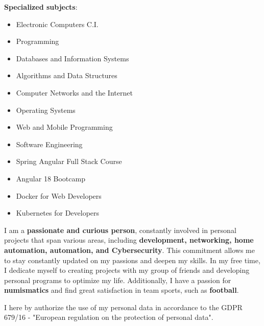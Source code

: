

\textbf{Specialized subjects}: %

\begin{itemize}
    \item Electronic Computers C.I.
    \item Programming
    \item Databases and Information Systems
    \item Algorithms and Data Structures
    \item Computer Networks and the Internet
    \item Operating Systems
    \item Web and Mobile Programming
    \item Software Engineering
\end{itemize}




\begin{itemize}
    \item Spring Angular Full Stack Course
    \item Angular 18 Bootcamp
    \item Docker for Web Developers
    \item Kubernetes for Developers
\end{itemize}


I am a \textbf{passionate and curious person}, constantly involved in personal projects that span various areas, including \textbf{development, networking, home automation, automation, and Cybersecurity}. This commitment allows me to stay constantly updated on my passions and deepen my skills.
In my free time, I dedicate myself to creating projects with my group of friends and developing personal programs to optimize my life. Additionally, I have a passion for \textbf{numismatics} and find great satisfaction in team sports, such as \textbf{football}.

\divider

\footnotesize{I here by authorize the use of my personal data in accordance to the GDPR 679/16 - "European regulation on the protection of personal data".}

